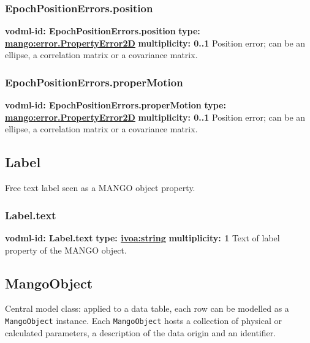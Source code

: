     \subsubsection{EpochPositionErrors.position}
      \textbf{vodml-id: EpochPositionErrors.position} \newline
      \textbf{type: \hyperref[sect:error.PropertyError2D]{mango:error.PropertyError2D}} \newline
      \textbf{multiplicity: 0..1} \newline
      Position error; can be an ellipse, a correlation matrix or a covariance matrix.

    \subsubsection{EpochPositionErrors.properMotion}
      \textbf{vodml-id: EpochPositionErrors.properMotion} \newline
      \textbf{type: \hyperref[sect:error.PropertyError2D]{mango:error.PropertyError2D}} \newline
      \textbf{multiplicity: 0..1} \newline
      Position error; can be an ellipse, a correlation matrix or a covariance matrix.

  \subsection{Label}
  \label{sect:Label}
    Free text label seen as a MANGO object property.

    \subsubsection{Label.text}
      \textbf{vodml-id: Label.text} \newline
      \textbf{type: \hyperref[sect:ivoa]{ivoa:string}} \newline
      \textbf{multiplicity: 1} \newline
      Text of label property of the MANGO object.

  \subsection{MangoObject}
  \label{sect:MangoObject}
    Central model class: applied to a data table, each row can be modelled as a \texttt{MangoObject} instance. Each \texttt{MangoObject} hosts a collection of physical or calculated parameters, a description of the data origin and an identifier.

